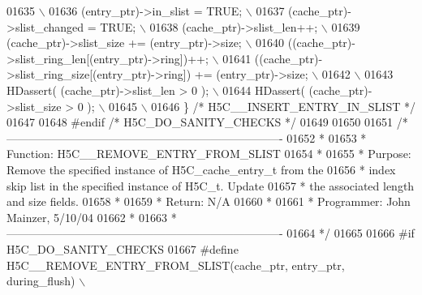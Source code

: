 \begin{DoxyCode}
01635 \textcolor{preprocessor}{                                                                               \(\backslash\)}
01636 \textcolor{preprocessor}{    (entry\_ptr)->in\_slist = TRUE;                                              \(\backslash\)}
01637 \textcolor{preprocessor}{    (cache\_ptr)->slist\_changed = TRUE;                                         \(\backslash\)}
01638 \textcolor{preprocessor}{    (cache\_ptr)->slist\_len++;                                                  \(\backslash\)}
01639 \textcolor{preprocessor}{    (cache\_ptr)->slist\_size += (entry\_ptr)->size;                              \(\backslash\)}
01640 \textcolor{preprocessor}{    ((cache\_ptr)->slist\_ring\_len[(entry\_ptr)->ring])++;                        \(\backslash\)}
01641 \textcolor{preprocessor}{    ((cache\_ptr)->slist\_ring\_size[(entry\_ptr)->ring]) += (entry\_ptr)->size;    \(\backslash\)}
01642 \textcolor{preprocessor}{                                                                               \(\backslash\)}
01643 \textcolor{preprocessor}{    HDassert( (cache\_ptr)->slist\_len > 0 );                                    \(\backslash\)}
01644 \textcolor{preprocessor}{    HDassert( (cache\_ptr)->slist\_size > 0 );                                   \(\backslash\)}
01645 \textcolor{preprocessor}{                                                                               \(\backslash\)}
01646 \textcolor{preprocessor}{\} }\textcolor{comment}{/* H5C\_\_INSERT\_ENTRY\_IN\_SLIST */}\textcolor{preprocessor}{}
01647 
01648 \textcolor{preprocessor}{#endif }\textcolor{comment}{/* H5C\_DO\_SANITY\_CHECKS */}\textcolor{preprocessor}{}
01649 
01650 
01651 \textcolor{comment}{/*-------------------------------------------------------------------------}
01652 \textcolor{comment}{ *}
01653 \textcolor{comment}{ * Function:    H5C\_\_REMOVE\_ENTRY\_FROM\_SLIST}
01654 \textcolor{comment}{ *}
01655 \textcolor{comment}{ * Purpose:     Remove the specified instance of H5C\_cache\_entry\_t from the}
01656 \textcolor{comment}{ *      index skip list in the specified instance of H5C\_t.  Update}
01657 \textcolor{comment}{ *      the associated length and size fields.}
01658 \textcolor{comment}{ *}
01659 \textcolor{comment}{ * Return:      N/A}
01660 \textcolor{comment}{ *}
01661 \textcolor{comment}{ * Programmer:  John Mainzer, 5/10/04}
01662 \textcolor{comment}{ *}
01663 \textcolor{comment}{ *-------------------------------------------------------------------------}
01664 \textcolor{comment}{ */}
01665 
01666 \textcolor{preprocessor}{#if H5C\_DO\_SANITY\_CHECKS}
01667 \textcolor{preprocessor}{#define H5C\_\_REMOVE\_ENTRY\_FROM\_SLIST(cache\_ptr, entry\_ptr, during\_flush)    \(\backslash\)}

\end{DoxyCode}
